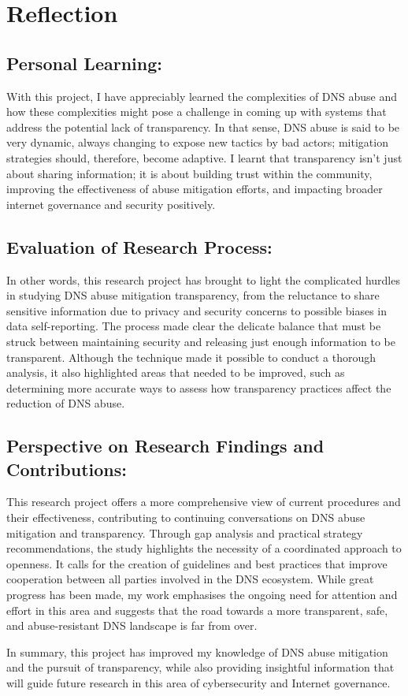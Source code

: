 \section{Reflection}
\subsection{Personal Learning: } 

With this project, I have appreciably learned the complexities of DNS abuse  and how these complexities might pose a challenge in coming up with systems that address the potential lack of transparency. In that sense, DNS abuse is said to be very dynamic, always changing to expose new tactics by bad actors; mitigation strategies should, therefore, become adaptive.  I learnt that transparency isn't just about sharing information; it is about building trust within the community, improving the effectiveness of abuse mitigation efforts, and impacting broader internet governance and security positively.

\subsection{Evaluation of Research Process:  }

In other words, this research project has brought to light the complicated hurdles in studying DNS abuse mitigation transparency, from the reluctance to share sensitive information due to privacy and security concerns to possible biases in data self-reporting. The process made clear the delicate balance that must be struck between maintaining security and releasing just enough information to be transparent. Although the technique made it possible to conduct a thorough analysis, it also highlighted areas that needed to be improved, such as determining more accurate ways to assess how transparency practices affect the reduction of DNS abuse.



\subsection{Perspective on Research Findings and Contributions: }

This research project offers a more comprehensive view of current procedures and their effectiveness, contributing to continuing conversations on DNS abuse mitigation and transparency. Through gap analysis and practical strategy recommendations, the study highlights the necessity of a coordinated approach to openness. It calls for the creation of guidelines and best practices that improve cooperation between all parties involved in the DNS ecosystem. While great progress has been made, my work emphasises the ongoing need for attention and effort in this area and suggests that the road towards a more transparent, safe, and abuse-resistant DNS landscape is far from over.


In summary, this project has improved my knowledge of DNS abuse mitigation and the pursuit of transparency, while also providing insightful information that will guide future research in this area of cybersecurity and Internet governance.



